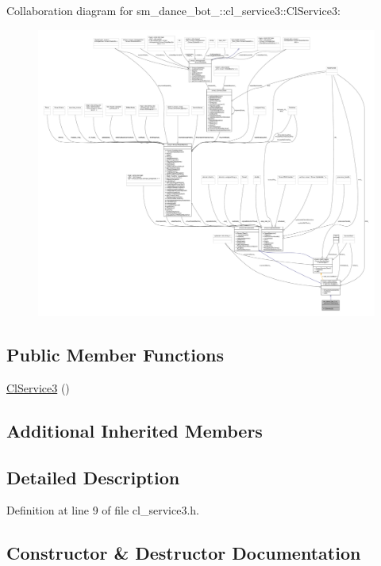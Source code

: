 Collaboration diagram for sm\+\_\+dance\+\_\+bot\+\_\+:\+:cl\+\_\+service3\+:\+:Cl\+Service3\+:
\nopagebreak
\begin{figure}[H]
\begin{center}
\leavevmode
\includegraphics[width=350pt]{classsm__dance__bot__3_1_1cl__service3_1_1ClService3__coll__graph}
\end{center}
\end{figure}
\subsection*{Public Member Functions}
\begin{DoxyCompactItemize}
\item 
\hyperlink{classsm__dance__bot__3_1_1cl__service3_1_1ClService3_a674993d78b486605cee5fdcc0346217e}{Cl\+Service3} ()
\end{DoxyCompactItemize}
\subsection*{Additional Inherited Members}


\subsection{Detailed Description}


Definition at line 9 of file cl\+\_\+service3.\+h.



\subsection{Constructor \& Destructor Documentation}
